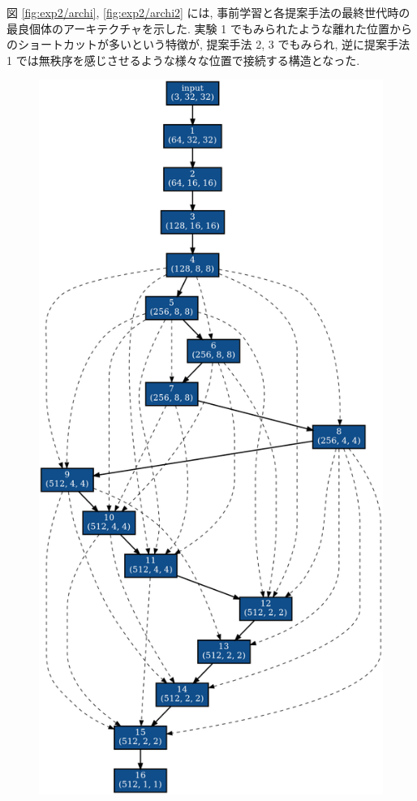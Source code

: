 図 \ref{fig:exp2/archi}, \ref{fig:exp2/archi2} には,
事前学習と各提案手法の最終世代時の最良個体のアーキテクチャを示した.
実験 1 でもみられたような離れた位置からのショートカットが多いという特徴が, 提案手法 2, 3 でもみられ,
逆に提案手法 1 では無秩序を感じさせるような様々な位置で接続する構造となった.


\begin{figure}[tb]
 \begin{minipage}{0.49\hsize}
 	\begin{center}
    \includegraphics[clip,scale=0.2]{./fig/04.exp/base.png}\\

\end{center}
\end{minipage}
\end{figure}
